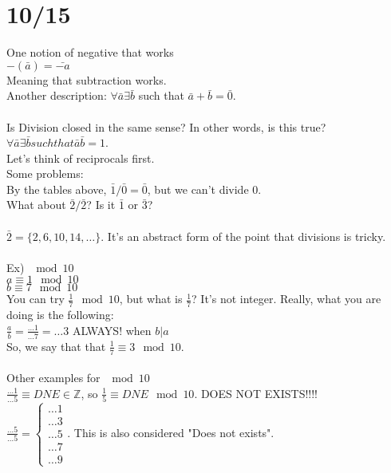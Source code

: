 \documentclass[13pt]{article}
\begin{document}
\section*{10/15}
	One notion of negative that works\\
	$-(\bar{a}) = \bar{-a}$\\
	Meaning that subtraction works.\\
	Another description: $\forall \bar{a} \exists \bar{b}$ such that $\bar{a}
	 + \bar{b} = \bar{0}$.\\\\
	Is Division closed in the same sense? In other words, is this true?
	$\forall \bar{a} \exists \bar{b} such that \bar{a}\bar{b} = 1$.\\
	Let's think of reciprocals first. \\
	Some problems:\\
	By the tables above, $\bar{1} / \bar{0} = \bar{0}$, but we can't divide 0.\\
	What about $\bar{2} / \bar{2}$? Is it $\bar{1}$ or $\bar{3}$?\\\\
	$\bar{2} = \{ 2, 6, 10, 14, \ldots \}$. It's an abstract form of the point
	that divisions is tricky.\\\\
	Ex) $\mod 10$\\
	$a \equiv 1 \mod 10$\\
	$b \equiv 7 \mod 10$\\
	You can try $\frac{1}{7} \mod 10$, but what is $\frac{1}{7}$? It's not
	integer. Really, what you are doing is the following:\\
	$\frac{a}{b} = \frac{\ldots 1}{\ldots 7} = \ldots 3$ ALWAYS! when $b|a$\\
	So, we say that that $\frac{1}{7} \equiv 3 \mod 10$.\\\\
	Other examples for $\mod 10$\\
	$\frac{\ldots 1}{\ldots 5} \equiv DNE \in \mathbb{Z}$, so $\frac{1}{5}
	\equiv DNE \mod 10$. DOES NOT EXISTS!!!!\\
	$\frac{\ldots 5}{\ldots 5} = \begin{cases} \ldots 1\\ \ldots 3 \\ \ldots 5
	\\ \ldots 7 \\ \ldots 9 \end{cases}$. This is also considered "Does not
	exists".\\
\end{document}
